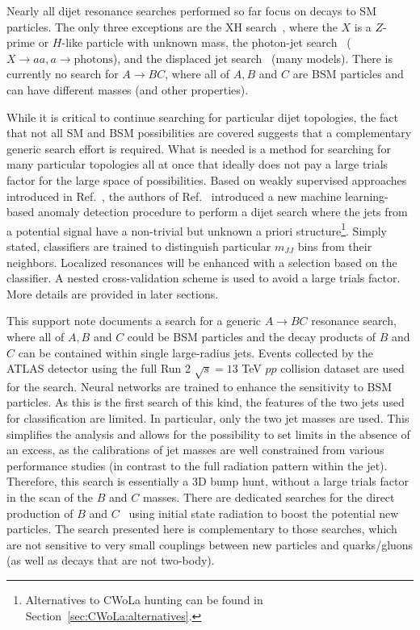 Nearly all dijet resonance searches performed so far focus on decays to SM particles.  The only three exceptions are the XH search~\cite{Aaboud:2018eoy,Aaboud:2017ecz}, where the $X$ is a $Z$-prime or $H$-like particle with unknown mass, the photon-jet search~\cite{Aaboud:2018djx} ($X\rightarrow aa, a\rightarrow \text{photons}$), and the displaced jet search~\cite{Aaboud:2018aqj} (many models).  There is currently no search for $A\rightarrow BC$, where all of $A,B$ and $C$ are BSM particles and can have different masses (and other properties).

While it is critical to continue searching for particular dijet topologies, the fact that not all SM and BSM possibilities are covered suggests that a complementary generic search effort is required.  What is needed is a method for searching for many particular topologies all at once that ideally does not pay a large trials factor for the large space of possibilities.  Based on weakly supervised approaches introduced in Ref.~\cite{Metodiev:2017vrx}, the authors of Ref.~\cite{Collins:2018epr,Collins:2019jip} introduced a new machine learning-based anomaly detection procedure to perform a dijet search where the jets from a potential signal have a non-trivial but unknown a priori structure\footnote{Alternatives to CWoLa hunting can be found in Section~\ref{sec:CWoLa:alternatives}.}.  Simply stated, classifiers are trained to distinguish particular $m_{JJ}$ bins from their neighbors.  Localized resonances will be enhanced with a selection based on the classifier.  A nested cross-validation scheme is used to avoid a large trials factor.  More details are provided in later sections.

This support note documents a search for a generic $A\rightarrow BC$ resonance search, where all of $A,B$ and $C$ could be BSM particles and the decay products of $B$ and $C$ can be contained within single large-radius jets.  Events collected by the ATLAS detector using the full Run 2 $\sqrt{s}=13$ TeV $pp$ collision dataset are used for the search.  Neural networks are trained to enhance the sensitivity to BSM particles.  As this is the first search of this kind, the features of the two jets used for classification are limited.  In particular, only the two jet masses are used.  This simplifies the analysis and allows for the possibility to set limits in the absence of an excess, as the calibrations of jet masses are well constrained from various performance studies (in contrast to the full radiation pattern within the jet).  Therefore, this search is essentially a 3D bump hunt, without a large trials factor in the scan of the $B$ and $C$ masses.  There are dedicated searches for the direct production of $B$ and $C$~\cite{Aaboud:2018zba,Aaboud:2018fzt,Aaboud:2018zba} using initial state radiation to boost the potential new particles.  The search presented here is complementary to those searches, which are not sensitive to very small couplings between new particles and quarks/gluons (as well as decays that are not two-body).

